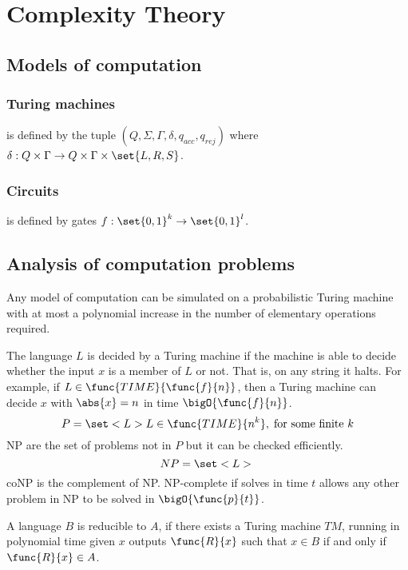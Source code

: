 \chapter{Complexity Theory}
\section{Models of computation}
\subsection{Turing machines}
is defined by the tuple \((Q,\Sigma, \Gamma, \delta, q_{acc}, q_{rej})\) where \(\delta: Q \times  \Gamma \to Q \times \Gamma \times \set{L,R,S}\).
\subsection{Circuits}
is defined by gates \(f: \set{0,1}^{k} \to \set{0,1}^l\).
\section{Analysis of computation problems}
\begin{definition} 
    Any model of computation can be simulated  on a probabilistic Turing machine with at most a polynomial increase in the number of elementary operations required.
\end{definition}
The language \(L\) is decided by a Turing machine if the machine is able to decide whether the input \(x\) is a member of \(L\)  or not. That is, on any string it halts. For example, if \(L \in \func{TIME}{\func{f}{n}}\), then a Turing machine can decide \(x\) with \(\abs{x} = n\) in time \(\bigO{\func{f}{n}}\). 
\begin{equation*}
    P = \set<L>{L \in \func{TIME}{n^k}, \; \text{for some finite} \ k}
\end{equation*}
NP are the set of problems not in \(P\) but it can be checked efficiently.
\begin{equation*}
    NP = \set<L>{}
\end{equation*}
coNP is the complement of NP. NP-complete if solves in time \(t\) allows any other problem in NP to be solved in \(\bigO{\func{p}{t}}\).

A language \(B\) is reducible to \(A\), if there exists a Turing machine \(TM\), running in polynomial time given \(x\) outputs \(\func{R}{x}\) such that \(x \in B\) if and only if \(\func{R}{x} \in A\).

